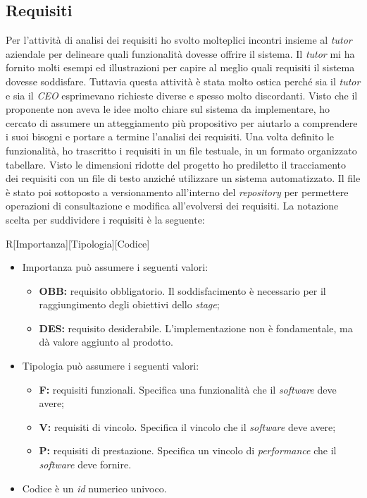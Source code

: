 \subsection{Requisiti}
Per l'attività di analisi dei requisiti ho svolto molteplici incontri insieme al \emph{tutor} aziendale per delineare quali funzionalità dovesse offrire il sistema. Il \emph{tutor} mi ha fornito molti esempi ed illustrazioni per capire al meglio quali requisiti il sistema dovesse soddisfare. Tuttavia questa attività è stata molto ostica perché sia il \emph{tutor} e sia il \emph{CEO} esprimevano richieste diverse e spesso molto discordanti. Visto che il proponente non aveva le idee molto chiare sul sistema da implementare, ho cercato di assumere un atteggiamento più propositivo per aiutarlo a comprendere i suoi bisogni e portare a termine l'analisi dei requisiti. Una volta definito le funzionalità, ho trascritto i requisiti in un file testuale, in un formato organizzato tabellare. Visto le dimensioni ridotte del progetto ho prediletto il tracciamento dei requisiti con un file di testo anziché utilizzare un sistema automatizzato. Il file è stato poi sottoposto a versionamento all'interno del \emph{repository} per permettere operazioni di consultazione e modifica all'evolversi dei requisiti. La notazione scelta per suddividere i requisiti è la seguente: 
\begin{center}
R[Importanza][Tipologia][Codice]
\end{center}
\begin{itemize}
\item Importanza può assumere i seguenti valori:
\begin{itemize}
\item \textbf{OBB:} requisito obbligatorio. Il soddisfacimento è necessario per il raggiungimento degli obiettivi dello \emph{stage};
\item \textbf{DES:} requisito desiderabile. L'implementazione non è fondamentale, ma dà valore aggiunto al prodotto.
\end{itemize}
\item Tipologia può assumere i seguenti valori:
\begin{itemize}
\item \textbf{F:} requisiti funzionali. Specifica una funzionalità che il \emph{software} deve avere;
\item \textbf{V:} requisiti di vincolo. Specifica il vincolo che il \emph{software} deve avere;
\item \textbf{P:} requisiti di prestazione. Specifica un vincolo di \emph{performance} che il \emph{software} deve fornire.
\end{itemize}
\item Codice è un \emph{id} numerico univoco.
\end{itemize}
